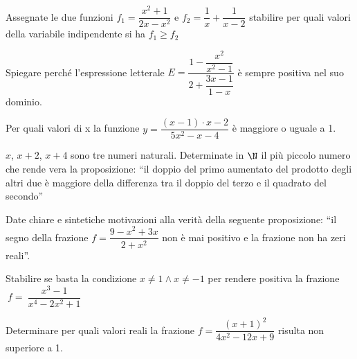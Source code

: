 \begin{esercizio}[*]
\label{ese:4.68}
Assegnate le due funzioni \(f_1=\dfrac{x^2+1}{2x-x^2}\) e \(f_2=\dfrac 1 
x+\dfrac 
1{x-2}\) stabilire per quali valori della variabile indipendente si ha 
\(f_1 \geqslant 
f_2\)
\end{esercizio}

\begin{esercizio}
\label{ese:4.69}
Spiegare perché l'espressione letterale 
\(E=\dfrac{1-\dfrac{x^2}{x^2-1}}{2+\dfrac{3x-1}{1-x}}\) è sempre positiva nel 
suo 
dominio.
\end{esercizio}

\begin{esercizio}
\label{ese:4.70}
Per quali valori di x la funzione \(y=\dfrac{(x-1) \cdot x-2}{5x^2-x-4}\) 
è maggiore o uguale a 1.
\end{esercizio}

\begin{esercizio}[*]
\label{ese:4.71}
\( x \), \( x+2 \), \( x+4 \) sono tre numeri naturali. Determinate in \( 
\N \) il 
più piccolo numero che rende vera la proposizione: ``il doppio del primo 
aumentato del prodotto degli altri due è maggiore della differenza tra il 
doppio 
del terzo e il quadrato del secondo''
\end{esercizio}

\begin{esercizio}
\label{ese:4.72}
Date chiare e sintetiche motivazioni alla verità della seguente proposizione: 
``il segno della frazione \(f=\dfrac{9-x^2+3x}{2+x^2}\) non è mai positivo e 
la 
frazione non ha zeri reali''.
\end{esercizio}

\begin{esercizio}
\label{ese:4.73}
Stabilire se basta la condizione \(x\neq 1\wedge x\neq -1\) per rendere 
positiva 
la frazione \(~f=~\dfrac{x^3-1}{x^4-2x^2+1}\)
\end{esercizio}

\begin{esercizio}
\label{ese:4.74}
Determinare per quali valori reali la frazione 
\(f=\dfrac{(x+1)^2}{4x^2-12x+9}\) 
risulta non superiore a 1.
\end{esercizio}


